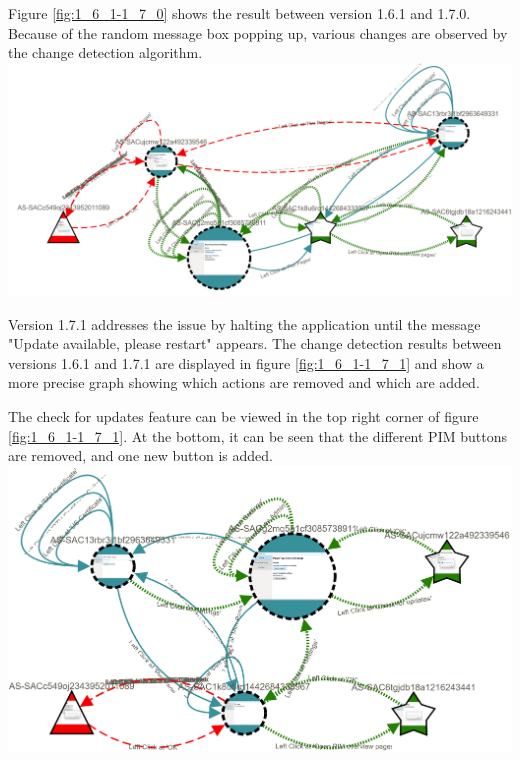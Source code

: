 Figure \ref{fig:1_6_1-1_7_0} shows the result between version 1.6.1 and 1.7.0. Because of the random message box popping up, various changes are observed by the change detection algorithm. 
\\
\begingroup
\captionsetup{type=figure}
\includegraphics[scale=0.3]{images/6-Experiment/1_6_1-1_7_0.png}
\label{fig:1_6_1-1_7_0}
\endgroup

Version 1.7.1 addresses the issue by halting the application until the message "Update available, please restart" appears. The change detection results between versions 1.6.1 and 1.7.1 are displayed in figure \ref{fig:1_6_1-1_7_1} and show a more precise graph showing which actions are removed and which are added.

The check for updates feature can be viewed in the top right corner of figure \ref{fig:1_6_1-1_7_1}. At the bottom, it can be seen that the different PIM buttons are removed, and one new button is added. 
\\
\begingroup
\captionsetup{type=figure}
\includegraphics[scale=0.35, angle=90]{images/6-Experiment/1_6_1-1_7_1.png}
\label{fig:1_6_1-1_7_1}
\endgroup

